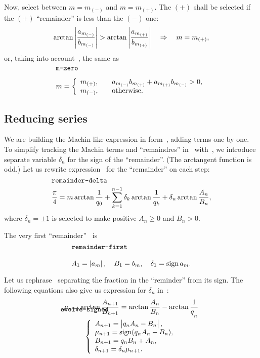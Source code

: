 \documentclass[draft, 11pt]{article} %
\begin{document}
Now, select between $m = m_{(-)}$ and $m = m_{(+)}$. The $(+)$ shall be
selected if the $(+)$ ``remainder'' is less than the $(-)$ one:
$$
\arctan\left| \displaystyle\frac{a_{m_{(-)}}}{b_{m_{(-)}}} \right| >
    \arctan\left| \displaystyle\frac{a_{m_{(+)}}}{b_{m_{(+)}}} \right|
\quad\Rightarrow\quad m = m_{(+)},
$$
or, taking into account~, the same as
%
\begin{equation}\mlabel{m-zero}
m = \left\{
\begin{array}{ll}
m_{(+)}, \quad & a_{m_{(-)}} b_{m_{(+)}} + a_{m_{(+)}} b_{m_{(-)}} > 0, \\
m_{(-)}, & \hbox{otherwise.}
\end{array}
\right.
\end{equation}

\subsection{Reducing series}

We are building the Machin-like expression in form~, adding
terms one by one.
To simplify tracking the Machin terms and ``remaindres'' in~
with~, we introduce separate variable $\delta_n$ for the sign of the ``remainder''.
(The arctangent function is odd.)
Let us rewrite expression~ for the ``remainder''
on each step:
%
\begin{equation}\mlabel{remainder-delta}
\dfrac{\pi}{4} = m \arctan\dfrac{1}{q_0}
    + \sum_{k=1}^{n-1} \delta_k \arctan\dfrac{1}{q_k}
    + \delta_n \arctan\dfrac{A_n}{B_n},
\end{equation}
where $\delta_n = \pm 1$ is selected to make positive $A_n \ge 0$ and $B_n > 0$.

The very first ``remainder''~ is
%
\begin{equation}\mlabel{remainder-first}
A_1 = \absolute{a_m}, \quad
B_1 = b_m, \quad
\delta_1 = \sign a_m.
\end{equation}

Let us rephrase~ separating the fraction in the ``reminder'' from its sign.
The following equations also give us expression for $\delta_n$ in~:
%
\begin{equation}\mlabel{evolve-signed}
\begin{array}{c}
\mu_{n+1} \arctan\dfrac{A_{n+1}}{B_{n+1}} =
    \arctan\dfrac{A_n}{B_n} - \arctan\dfrac{1}{q_{n \strut}} \\
\left\{\begin{array}{l}
A_{n+1} = \absolute{q_n A_n - B_n \strut}, \\
\mu_{n+1} = \sign (q_n A_n - B_n), \\
B_{n+1} = q_n B_n + A_n, \\
\delta_{n+1} = \delta_n \mu_{n+1}.
\end{array}\right.
\end{array}
\end{equation}
\end{document}
